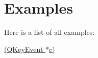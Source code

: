 \section{Examples}
Here is a list of all examples\+:\begin{DoxyCompactItemize}
\item 
\hyperlink{How-example}{(\+Q\+Key\+Event $\ast$c)}
\end{DoxyCompactItemize}
